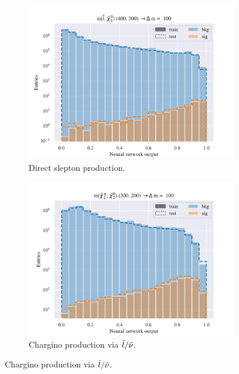 \begin{figure}[H]
    \centering
    \begin{subfigure}[t!]{0.49\textwidth}
        \includegraphics[width = \textwidth]{Figures/SlepSlep/ML/NN/High_level/Low/scaled_train_test_395984.pdf}
        \caption{Direct slepton production.}
        \label{fig:SlepslepNNLow}
    \end{subfigure}
    \begin{subfigure}[t!]{0.49\textwidth}
        \includegraphics[width = \textwidth]{Figures/SlepSnu/NN/High_level/Low/scaled_train_test_397115.pdf}
        \caption{Chargino production via $\Tilde{l}/\Tilde{\nu}$.}
        \label{fig:SlepsnuNNLow}
    \end{subfigure}    

\end{figure}
